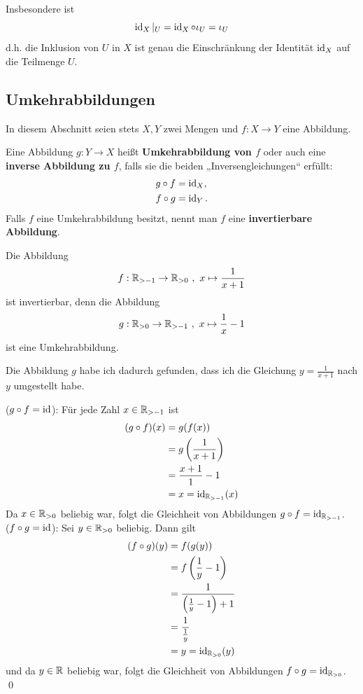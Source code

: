 \begin{bem}
Insbesondere ist
\[ \operatorname{id}_X \vert_U = \operatorname{id}_X \circ \iota_U =  \iota_U\]
d.h. die Inklusion von $U$ in $X$ ist genau die Einschränkung der Identität $\operatorname{id}_X$ auf die Teilmenge $U$.
\end{bem}







\subsection{Umkehrabbildungen}
In diesem Abschnitt seien stets $X,Y$ zwei Mengen und $f:X\to Y$ eine Abbildung.

\begin{de}[Umkehrabbildung] \label{umkehrabb}
Eine Abbildung $g:Y \to X$ heißt \textbf{Umkehrabbildung von $f$} oder auch eine \textbf{inverse Abbildung zu $f$}, falls sie die beiden „Inversengleichungen“ erfüllt:
	\begin{align*}
    g \circ f &= \operatorname{id}_X, \\
    f \circ g &= \operatorname{id}_Y.
	\end{align*}
Falls $f$ eine Umkehrabbildung besitzt, nennt man $f$ eine \textbf{invertierbare Abbildung}.
\end{de}



\begin{bsp}
Die Abbildung
\[f : {\mathbb R}_{>-1} \to {\mathbb R}_{>0} \ ,\ x \mapsto \frac{1}{x+1} \]
ist invertierbar, denn die Abbildung
\[g: {\mathbb R}_{>0} \to {\mathbb R}_{>-1} \ ,\ x \mapsto \frac{1}{x} -1 \]
ist eine Umkehrabbildung.
\end{bsp}
Die Abbildung $g$ habe ich dadurch gefunden, dass ich die Gleichung $y= \frac{1}{x+1}$ nach $y$ umgestellt habe.
\begin{bew}
 ($g\circ f = \operatorname{id}$): Für jede Zahl $x\in {\mathbb R}_{>-1}$ ist
 \begin{align*}
 (g\circ f)(x) & = g(f(x)) \\
 & = g\left(\frac{1}{x+1}\right) \\
 & = \frac{x+1}{1} - 1 \\
 & = x = \operatorname{id}_{{\mathbb R}_{>-1}}(x)
 \end{align*}
Da $x\in {\mathbb R}_{>0}$ beliebig war, folgt die Gleichheit von Abbildungen $g \circ f= \operatorname{id}_{{\mathbb R}_{>-1}}$. \\[0.5em]
 ($f\circ g = \operatorname{id}$): Sei $y\in {\mathbb R}_{>0}$ beliebig. Dann gilt
 \begin{align*}
  (f\circ g)(y) & = f(g(y)) \\
  & = f\left( \frac{1}{y} -1\right) \\
  & = \frac{1}{\left(\frac{1}{y} -1\right) +1} \\
  & = \frac{1}{\frac{1}{y}} \\
  & = y = \operatorname{id}_{{\mathbb R}_{>0}}(y)
 \end{align*}
 und da $y\in {\mathbb R}$ beliebig war, folgt die Gleichheit von Abbildungen $f\circ g = \operatorname{id}_{{\mathbb R}_{>0}}$. \qed
\end{bew}








